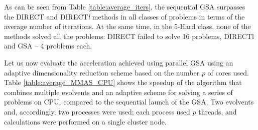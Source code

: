 \documentclass{svproc}
\begin{document}
  As can be seen from Table \ref{table:average_iters}, the sequential GSA surpasses the DIRECT and DIRECT\textit{l} methods in all classes of problems in terms of the average number of iterations. At the same time, in the 5-Hard class, none of the methods solved all the problems: DIRECT failed to solve 16 problems, DIRECTl and GSA -- 4 problems each.




Let us now evaluate the acceleration achieved using parallel GSA using an adaptive dimensionality reduction scheme based on the number $p$ of cores used.
Table \ref{table:average_MMAS_CPU} shows the speedup of the algorithm that combines multiple evolvents and an adaptive scheme for solving a series of problems on CPU, compared to the sequential launch of the GSA. Two evolvents and, accordingly, two processes were used; each process used $p$ threads, and calculations were performed on a single cluster node.
   
\end{document}

